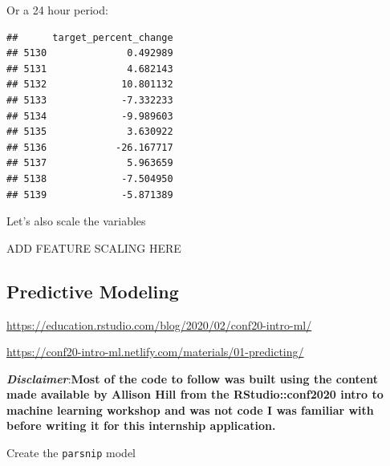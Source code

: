 \documentclass[
]{book}
\newenvironment{Shaded}{\begin{snugshade}}{\end{snugshade}}
\newcommand{\DecValTok}[1]{\textcolor[rgb]{0.00,0.00,0.81}{#1}}
\newcommand{\KeywordTok}[1]{\textcolor[rgb]{0.13,0.29,0.53}{\textbf{#1}}}
\newcommand{\NormalTok}[1]{#1}
\newcommand{\OperatorTok}[1]{\textcolor[rgb]{0.81,0.36,0.00}{\textbf{#1}}}
\newcommand{\StringTok}[1]{\textcolor[rgb]{0.31,0.60,0.02}{#1}}
\begin{document}
Or a 24 hour period:

\begin{Shaded}
\end{Shaded}

\begin{verbatim}
##      target_percent_change
## 5130              0.492989
## 5131              4.682143
## 5132             10.801132
## 5133             -7.332233
## 5134             -9.989603
## 5135              3.630922
## 5136            -26.167717
## 5137              5.963659
## 5138             -7.504950
## 5139             -5.871389
\end{verbatim}

Let's also scale the variables

ADD FEATURE SCALING HERE

\hypertarget{predictive-modeling}{%
\subsection{Predictive Modeling}\label{predictive-modeling}}

\url{https://education.rstudio.com/blog/2020/02/conf20-intro-ml/}

\url{https://conf20-intro-ml.netlify.com/materials/01-predicting/}

\textbf{\emph{Disclaimer}}:\textbf{Most of the code to follow was built using the content made available by Allison Hill from the RStudio::conf2020 intro to machine learning workshop and was not code I was familiar with before writing it for this internship application.}

Create the \texttt{parsnip} \citep{R-parsnip} model

\begin{Shaded}
\end{Shaded}
\end{document}
